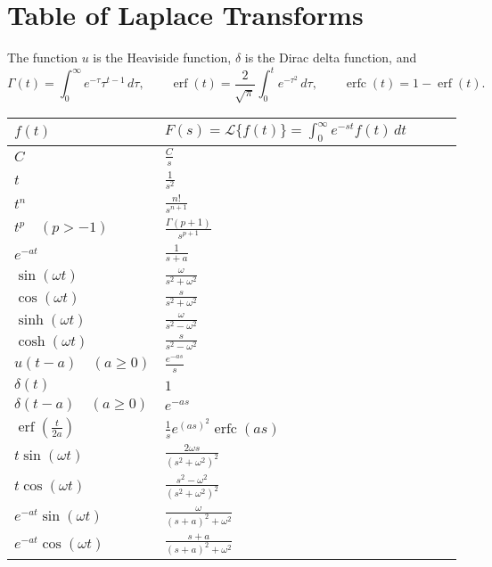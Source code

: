 \chapter{Table of Laplace Transforms} \label{laplacelist:appendix}


The function $u$ is the
Heaviside function, $\delta$ is the Dirac delta function, and 
\begin{equation*}
\Gamma(t) =
\int_0^\infty e^{-\tau} \tau^{t-1} \, d\tau ,
\qquad
\operatorname{erf}(t) =
\frac{2}{\sqrt{\pi}} \int_0^t e^{-\tau^2} \, d\tau ,
\qquad
\operatorname{erfc}(t) =
1 - \operatorname{erf}(t) .
\end{equation*}

\begin{center}
\begin{tabular}{@{}lllll@{}}
\toprule
$f(t)$ &
$F(s) = \mathcal{L} \bigl\{ f(t) \bigr\}= \int_0^\infty e^{-st} f(t) \, dt$ \\
\midrule
$C$ & $\frac{C}{s}$
\\[6pt]
$t$ & $\frac{1}{s^2}$
\\[6pt]
$t^n$ & $\frac{n!}{s^{n+1}}$
\\[6pt]
$t^p \quad (p > -1)$ & $\frac{\Gamma(p+1)}{s^{p+1}}$
\\[6pt]
$e^{-at}$ & $\frac{1}{s+a}$
\\[6pt]
$\sin (\omega t)$ & $\frac{\omega}{s^2+\omega^2}$
\\[6pt]
$\cos (\omega t)$ & $\frac{s}{s^2+\omega^2}$
\\[6pt]
$\sinh (\omega t)$ & $\frac{\omega}{s^2-\omega^2}$
\\[6pt]
$\cosh (\omega t)$ & $\frac{s}{s^2-\omega^2}$
\\[6pt]
$u(t-a) \quad (a \geq 0)$ & $\frac{e^{-as}}{s}$
\\[6pt]
$\delta(t)$ & $1$
\\[6pt]
$\delta(t-a) \quad (a \geq 0)$ & $e^{-as}$
\\[6pt]
$\operatorname{erf}\left( \frac{t}{2a} \right)$ & $\frac{1}{s} e^{(as)^2} \operatorname{erfc}(as)$
\\[6pt]
$t \sin(\omega t)$ &
$\frac{2\omega s}{{(s^2+\omega^2)}^2}$
\\[6pt]
$t \cos(\omega t)$ &
$\frac{s^2-\omega^2}{{(s^2+\omega^2)}^2}$
\\[6pt]
$e^{-at} \sin(\omega t)$ &
$\frac{\omega}{{(s+a)}^2 + \omega^2}$
\\[6pt]
$e^{-at} \cos(\omega t)$ &
$\frac{s+a}{{(s+a)}^2 + \omega^2}$
\\[6pt]
\bottomrule
\end{tabular}
\end{center}

